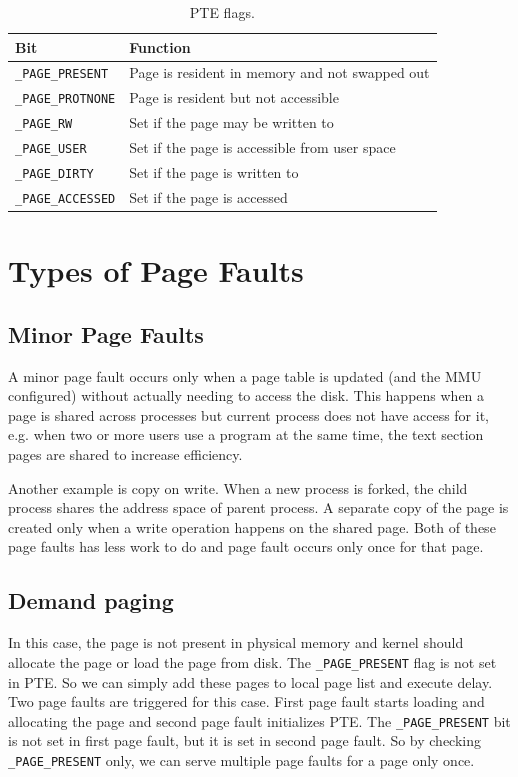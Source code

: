 \begin{table}[tbp]
	\centering
	\caption{PTE flags.}
	\label{tab:pte_flags}
	\begin{tabular}{ll}
		\toprule 
		Bit & Function \\
		\midrule
		\verb|_PAGE_PRESENT| & Page is resident in memory and not swapped out \\
		\verb|_PAGE_PROTNONE| & Page is resident but not accessible \\
		\verb|_PAGE_RW| & Set if the page may be written to \\
		\verb|_PAGE_USER| & Set if the page is accessible from user space \\
		\verb|_PAGE_DIRTY| & Set if the page is written to \\
		\verb|_PAGE_ACCESSED| & Set if the page is accessed \\
		\bottomrule
	\end{tabular}  
\end{table}


\section{Types of Page Faults}

\subsection{Minor Page Faults}
A minor page fault occurs only when a page table is updated (and the MMU configured) without actually needing to access the disk. This happens when a page is shared across processes but current process does not have access for it, e.g. when two or more users use a program at the same time, the text section pages are shared to increase efficiency.

Another example is copy on write. When a new process is forked, the child process shares the address space of parent process. A separate copy of the page is created only when a write operation happens on the shared page.
Both of these page faults has less work to do and page fault occurs only once for that page.

\subsection{Demand paging}
In this case, the page is not present in physical memory and kernel should allocate the page or load the page from disk.
The \verb|_PAGE_PRESENT| flag is not set in PTE. So we can simply add these pages to local page list and execute delay. Two page faults are triggered for this case. First page fault starts loading and allocating the page and second page fault initializes PTE. The \verb|_PAGE_PRESENT| bit is not set in first page fault, but it is set in second page fault. So by checking \verb|_PAGE_PRESENT| only, we can serve multiple page faults for a page only once.

